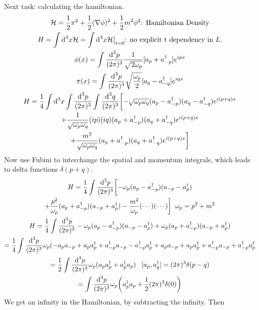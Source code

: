\documentclass[]{scrartcl}
\begin{document}
Next task: calculating the hamiltonian.
\begin{gather}
	\mathcal{H} = \frac{1}{2}\pi^2 + \frac{1}{2} (\nabla\phi)^2 + \frac{1}{2}m^2\phi^2\text{: Hamiltonian Density}\\
	H = \int\text d^3x \mathcal{H} = \int \text d^3x \mathcal{H}\big\rvert_{t=0}\text{: no explicit t dependency in $L$.}\\
	\phi(x) = \int \frac{\text d^3 p}{(2\pi)^3}\frac{1}{\sqrt{2\omega_p}}[a_p + a_{-p}^\dagger]e^{ipx}\\
	\pi(x) = \int \frac{\text d^3p}{(2\pi)^3}\sqrt{\frac{\omega_p}{2}}[a_q - a_{-q}^\dagger]e^{iqx}\\
	H = \frac{1}{4}\int\text d^3x \int \frac{\text d^3p}{(2\pi)^3} \int \frac{\text d ^3q}{(2\pi)^3} \biggl[-\sqrt{\omega_p\omega_q}(a_p -a_{-p}^\dagger)(a_q - a_{-q}^\dagger)e^{i(p+q)x}\\ 
	+ \frac{1}{\sqrt{\omega_p\omega_q}}(ip)(iq)(a_p + a_{-p}^\dagger)(a_q + a_{-q}^\dagger)e^{i(p+q)x} \nonumber \\ 
	+ \frac{m^2}{\sqrt{\omega_p\omega_q}}(a_p + a_{-p}^\dagger)(a_q + a_{-q}^\dagger)e^{i(p+q)x}\biggr] \nonumber
\end{gather}
Now use Fubini to interchange the spatial and momentum integrals, which leads to delta functions $\delta(p + q)$.
\begin{gather}
	H = \frac{1}{4}\int \frac{\text d^3p}{(2\pi)^3}\biggl[-\omega_p (a_p - a_{-p}^\dagger)(a_{-p}- a_p^\dagger)\\
	+ \frac{p^2}{\omega_p}(a_p + a_{-p}^\dagger)(a_{-p} + a_p^\dagger) - \frac{m^2}{\omega_p}(\cdots)(\cdots)\biggr]\;\; \omega_p = p^2 + m^2 \nonumber\\
	H = \frac{1}{4}\int \frac{\text d^3p}{(2\pi)^3}-\omega_p (a_p - a_{-p}^\dagger)(a_{-p} - a_p^\dagger) + \omega_p (a_p + a_{-p}^\dagger)(a_{-p} + a_p^\dagger)\\
	= \frac{1}{4}\int \frac{\text d^3p}{(2\pi)^3} \omega_p (- a_p a_{-p} + a_pa_p^\dagger + a_{-p}^\dagger a_{-p} - a_{-p}^\dagger a_p^\dagger + a_p a_{-p} + a_pa_p^\dagger + a_{-p}^\dagger a_{-p} + a_{-p}^\dagger a_p^\dagger\\
	= \frac{1}{2}\int \frac{\text d^3p}{(2\pi)^3}\omega_p (a_p a_p^\dagger + a_p^\dagger a_p) \;\;\; [a_p, a_q^\dagger] = (2\pi)^3 \delta(p-q)\\
	= \int \frac{\text d^3p}{(2\pi)^3} \omega_p \biggr(a_p^\dagger a_p + \frac{1}{2}(2\pi)^3\delta(0)\biggl)
\end{gather}
We get an infinity in the Hamiltonian, by subtracting the infinity. Then
\end{document}
